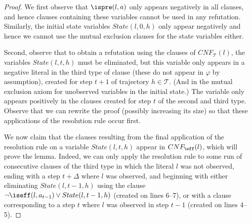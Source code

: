 {\begin{proof}
We first observe that $\ispre(l,a)$ only appears negatively in all clauses, and hence clauses containing these variables cannot be used in any refutation. Similarly, the initial state variables $State(l,0,h)$ only appear negatively and hence we cannot use the mutual exclusion clauses for the state variables either.

Second, observe that to obtain a refutation using the clauses of $CNF_{\mathcal{T}}(l)$, the variables $State(l,t,h)$ must be eliminated, but this variable only appears in a negative literal in the third type of clause (these do not appear in $\varphi$ by assumption), created for step $t+1$ of trajectory $h\in\mathcal{T}$. (And in the mutual exclusion axiom for unobserved variables in the initial state.) The variable only appears positively in the clauses created for step $t$ of the second and third type. Observe that we can rewrite the proof (possibly increasing its size) so that these applications of the resolution rule occur first.

We now claim that the clauses resulting from the final application of the resolution rule on a variable $State(l,t,h)$ appear in $CNF_{\eff}(l)$, which will prove the lemma. Indeed, we can only apply the resolution rule to some run of consecutive clauses of the third type in which the literal $l$ was not observed, ending with a step $t+\Delta$ where $l$ was observed, and beginning with either eliminating $State(l,t-1,h)$ using the clause $\neg \iseff(l,a_{t-1})\vee State(l,t-1,h)$ (created on lines 6--7), or with a clause corresponding to a step $t$ where $l$ was observed in step $t-1$ (created on lines 4--5). 
\end{proof}
}\fi







